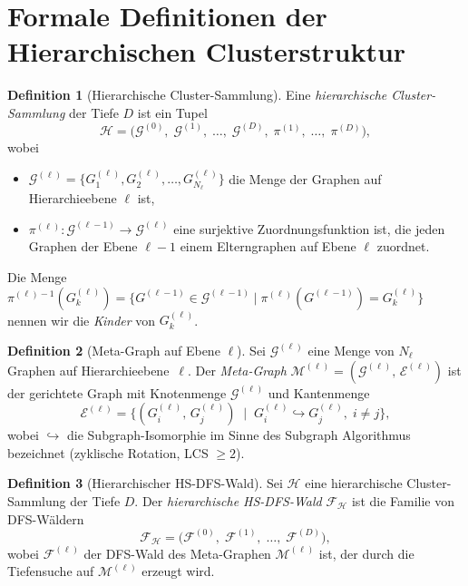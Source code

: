 ﻿\documentclass[a4paper,12pt]{report}
\theoremstyle{definition}
\newtheorem{definition}{Definition}
\begin{document}
\section{Formale Definitionen der Hierarchischen Clusterstruktur}
\label{ssec:hsdfs_defs}

\begin{definition}[Hierarchische Cluster-Sammlung]
\label{def:hier_kollektion}
Eine \emph{hierarchische Cluster-Sammlung} der Tiefe $D$ ist ein Tupel
\[
\mathcal{H} = \bigl(\mathcal{G}^{(0)},\; \mathcal{G}^{(1)},\; \ldots,\; \mathcal{G}^{(D)},\;
                     \pi^{(1)},\; \ldots,\; \pi^{(D)}\bigr),
\]
wobei
\begin{itemize}
    \item $\mathcal{G}^{(\ell)} = \{G^{(\ell)}_1, G^{(\ell)}_2, \ldots, G^{(\ell)}_{N_\ell}\}$ die Menge der Graphen auf Hierarchieebene $\ell$ ist,
    \item $\pi^{(\ell)}: \mathcal{G}^{(\ell-1)} \to \mathcal{G}^{(\ell)}$ eine surjektive Zuordnungsfunktion ist, die jeden Graphen der Ebene $\ell{-}1$ einem Elterngraphen auf Ebene $\ell$ zuordnet.
\end{itemize}
Die Menge $\pi^{(\ell)-1}(G^{(\ell)}_k) = \{G^{(\ell-1)} \in \mathcal{G}^{(\ell-1)} \mid \pi^{(\ell)}(G^{(\ell-1)}) = G^{(\ell)}_k\}$ nennen wir die \emph{Kinder} von $G^{(\ell)}_k$.
\end{definition}

\begin{definition}[Meta-Graph auf Ebene $\ell$]
\label{def:meta_graph_l}
Sei $\mathcal{G}^{(\ell)}$ eine Menge von $N_\ell$ Graphen auf Hierarchieebene~$\ell$.
Der \emph{Meta-Graph} $\mathcal{M}^{(\ell)} = (\mathcal{G}^{(\ell)},\, \mathcal{E}^{(\ell)})$ ist der gerichtete Graph mit Knotenmenge $\mathcal{G}^{(\ell)}$ und Kantenmenge
\[
\mathcal{E}^{(\ell)} = \bigl\{(G^{(\ell)}_i,\, G^{(\ell)}_j) \;\mid\;
G^{(\ell)}_i \hookrightarrow G^{(\ell)}_j,\; i \neq j \bigr\},
\]
wobei $\hookrightarrow$ die Subgraph-Isomorphie im Sinne des Subgraph Algorithmus bezeichnet (zyklische Rotation, LCS $\geq 2$).
\end{definition}

\begin{definition}[Hierarchischer HS-DFS-Wald]
\label{def:hsdfs_wald}
Sei $\mathcal{H}$ eine hierarchische Cluster-Sammlung der Tiefe $D$.
Der \emph{hierarchische HS-DFS-Wald} $\mathcal{F}_\mathcal{H}$ ist die Familie von DFS-Wäldern
\[
\mathcal{F}_\mathcal{H} = \bigl(\mathcal{F}^{(0)},\; \mathcal{F}^{(1)},\; \ldots,\; \mathcal{F}^{(D)}\bigr),
\]
wobei $\mathcal{F}^{(\ell)}$ der DFS-Wald des Meta-Graphen $\mathcal{M}^{(\ell)}$ ist, der durch die Tiefensuche auf $\mathcal{M}^{(\ell)}$ erzeugt wird.
\end{definition}
\end{document}

